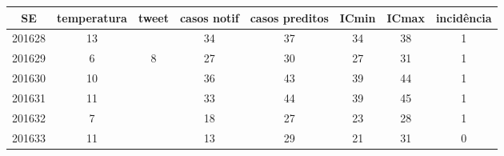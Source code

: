 \begin{tabular}{c|ccccccc}
  \hline
SE & temperatura & tweet & casos notif & casos preditos & ICmin & ICmax & incidência \\ 
  \hline
201628 & 13 &  & 34 & 37 & 34 & 38 & 1 \\ 
  201629 & 6 & 8 & 27 & 30 & 27 & 31 & 1 \\ 
  201630 & 10 &  & 36 & 43 & 39 & 44 & 1 \\ 
  201631 & 11 &  & 33 & 44 & 39 & 45 & 1 \\ 
  201632 & 7 &  & 18 & 27 & 23 & 28 & 1 \\ 
  201633 & 11 &  & 13 & 29 & 21 & 31 & 0 \\ 
   \hline
\end{tabular}
